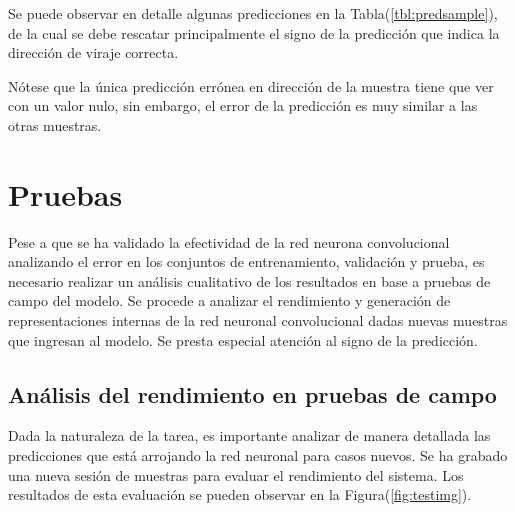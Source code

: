     Se puede observar en detalle algunas predicciones en la Tabla(\ref{tbl:predsample}), de la cual se debe rescatar principalmente el signo 
    de la predicción que indica la dirección de viraje correcta.

    \begin{table}[]
        \centering
        \caption{Muestra de predicciones de la red convolucional}
        \label{tbl:predsample}
    \end{table}

    Nótese que la única predicción errónea en dirección de la muestra tiene que ver con un valor nulo, sin embargo, el error 
    de la predicción es muy similar a las otras muestras.
\section{Pruebas}\label{sec:analisistest}

Pese a que se ha validado la efectividad de la red neurona convolucional analizando el error en los conjuntos de entrenamiento, 
validación y prueba, es necesario realizar un análisis cualitativo de los resultados en base a pruebas de campo del modelo.
Se procede a analizar el rendimiento y generación de representaciones internas de la red neuronal convolucional dadas 
nuevas muestras que ingresan al modelo. Se presta especial atención al signo de la predicción.

    \subsection{Análisis del rendimiento en pruebas de campo}
    Dada la naturaleza de la tarea, es importante analizar de manera detallada las predicciones que está arrojando la red 
    neuronal para casos nuevos. Se ha grabado una nueva sesión de muestras para evaluar el rendimiento del sistema. Los 
    resultados de esta evaluación se pueden observar en la Figura(\ref{fig:testimg}).

